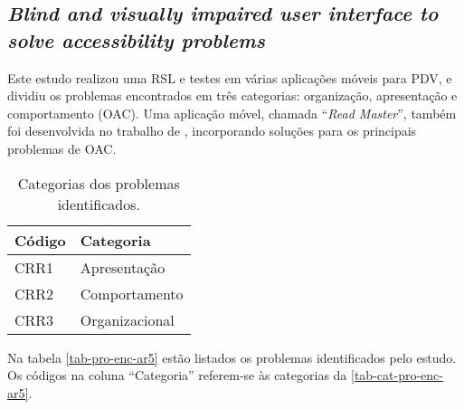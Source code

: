 \newpage

\subsection{\emph{Blind and visually impaired user interface to solve accessibility problems}}

Este estudo realizou uma RSL e testes em várias aplicações móveis para PDV, e dividiu os problemas encontrados em três categorias: organização, apresentação e comportamento (OAC).
Uma aplicação móvel, chamada ``\emph{Read Master}'', também foi desenvolvida no trabalho de , incorporando soluções para os principais problemas de OAC\@.

\begin{table}[htb]
  \begin{center}
    \ABNTEXfontereduzida
    \caption{Categorias dos problemas identificados.}
    \label{tab-cat-pro-enc-ar5}
    \begin{tabular}{p{2.0cm}|p{5.0cm}}
      \textbf{Código} & \textbf{Categoria} \\
      \hline
      CRR1            & Apresentação       \\
      \hline
      CRR2            & Comportamento      \\
      \hline
      CRR3            & Organizacional     \\
    \end{tabular}
  \end{center}
\end{table}

Na tabela \autoref{tab-pro-enc-ar5} estão listados os problemas identificados pelo estudo.
Os códigos na coluna ``Categoria'' referem-se às categorias da \autoref{tab-cat-pro-enc-ar5}.

